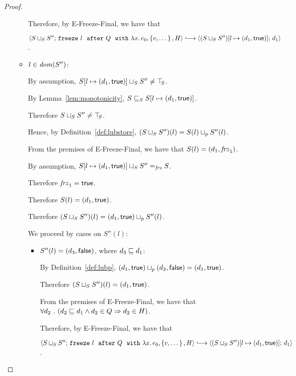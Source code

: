 \begin{proof}
\begin{itemize}
\begin{itemize}
        Therefore, by {\sc E-Freeze-Final}, we have that

        $\config{\lubstore{S}{S''}}{\freezeafterfull{l}{Q}{\lam{x}{e_0}}{\setof{v,
              \dots}}{H}} \parstepsto
        \config{\extS{(\lubstore{S}{S''})}{l}{d_1}{\frozentrue}}{d_1}$.


      \item $l \in \mathit{dom}(S'')$:

        By assumption, $S[l \mapsto (d_1, \textsf{true})] \sqcup_{S} S''
        \neq \top\hspace{-0.85mm}_{S}$.

        By Lemma~\ref{lem:monotonicity},
        $S \sqsubseteq_S S[l \mapsto (d_1, \textsf{true})]$.

        Therefore $S \sqcup_{S} S'' \neq \top\hspace{-0.85mm}_{S}$.

        Hence, by Definition~\ref{def:lubstore},
        $(S \sqcup_{S} S'')(l) = S(l) \sqcup_p S''(l)$.

        From the premises of {\sc E-Freeze-Final}, we have that
        $S(l) = (d_1, \mathit{frz}_1)$.

        By assumption, $S[l \mapsto (d_1, \textsf{true})] \sqcup_{S} S''
        =_{\textit{frz}} S$.

        Therefore $\mathit{frz}_1 = \textsf{true}$.

        Therefore $S(l) = (d_1, \textsf{true})$.

        Therefore $(S \sqcup_{S} S'')(l) =
        (d_1, \textsf{true}) \sqcup_p S''(l)$.

        We proceed by cases on $S''(l)$:
        \begin{itemize}
        \item $S''(l) = (d_3, \textsf{false})$, where $d_3 \sqsubseteq d_1$:

          By Definition~\ref{def:lubp},
          $(d_1, \textsf{true}) \sqcup_p (d_3, \textsf{false})
          = (d_1, \textsf{true})$.

          Therefore $(S \sqcup_{S} S'')(l) =
          (d_1, \textsf{true})$.

          From the premises of {\sc E-Freeze-Final}, we have that
          $\forall{d_2} ~.~ ( {d_2 \sqsubseteq d_1 \land d_2 \in Q} \Rightarrow d_2 \in
          H)$.

          Therefore, by {\sc E-Freeze-Final}, we have that

          $\config{\lubstore{S}{S''}}{\freezeafterfull{l}{Q}{\lam{x}{e_0}}{\setof{v,
                \dots}}{H}} \parstepsto
          \config{\extS{(\lubstore{S}{S''})}{l}{d_1}{\frozentrue}}{d_1}$.


\end{itemize}
\end{itemize}
\end{itemize}
\end{proof}
